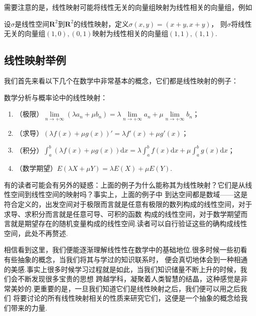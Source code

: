 需要注意的是，线性映射可能将线性无关的向量组映射为线性相关的向量组，例如
\begin{example}
    设$\sigma$是线性空间$\mathbf{R}^2$到$\mathbf{R}^2$的线性映射，定义$\sigma(x,y)=(x+y,x+y)$，
    则$\sigma$将线性无关的向量组$(1,0),(0,1)$映射为线性相关的向量组$(1,1),(1,1)$.
\end{example}

\subsection{线性映射举例}
我们首先来看以下几个在数学中非常基本的概念，它们都是线性映射的例子：
\begin{example}
    数学分析与概率论中的线性映射：
    \begin{enumerate}
        \item （极限）$\lim\limits_{n\to +\infty}(\lambda a_n+\mu b_n)=\lambda\lim\limits_{n\to +\infty}a_n+\mu\lim\limits_{n\to +\infty}b_n$；
        \item （求导）$(\lambda f(x)+\mu g(x))'=\lambda f'(x)+\mu g'(x)$；
        \item （积分）$\int_a^b(\lambda f(x)+\mu g(x))\mathrm{d}x=\lambda\int_a^bf(x)\mathrm{d}x+\mu\int_a^bg(x)\mathrm{d}x$；
        \item （数学期望）$E(\lambda X+\mu Y)=\lambda E(X)+\mu E(Y)$.
    \end{enumerate}
\end{example}

有的读者可能会有另外的疑惑：上面的例子为什么能称其为线性映射？它们是从线性空间到线性空间的映射吗？事实上，上面的例子中
到达空间都是数域——这是符合定义的，出发空间对于极限而言就是任意有极限的数列构成的线性空间，对于求导、求积分而言就是任意可导、可积的函数
构成的线性空间，对于数学期望而言就是期望存在的随机变量构成的线性空间.读者可以自行验证这些的确构成线性空间，此处不再赘述.

相信看到这里，我们便能逐渐理解线性性在数学中的基础地位.很多时候一些初看有些抽象的概念，当我们将其与学过的知识联系时，
便会真切地体会到一种相通的美感.事实上很多时候学习过程就是如此，当我们知识储量不断上升的时候，我们会不断发现很多宝贵的思想
跨越学科，凝聚着人类智慧的结晶，这种感觉是非常美妙的.更重要的是，一旦我们知道它们是线性映射之后，我们便可以用之后我们
将要讨论的所有线性映射相关的性质来研究它们，这便是一个抽象的概念给我们带来的力量.

